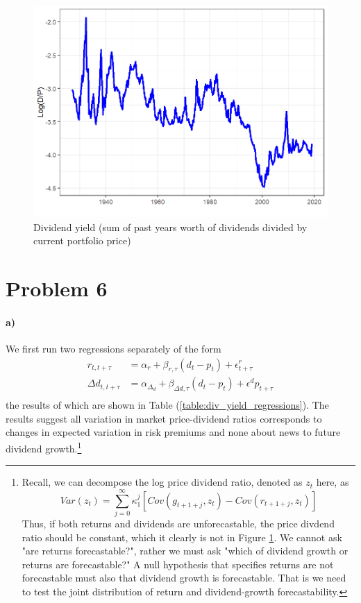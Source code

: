 \documentclass[11pt,letter]{article}
\begin{document}
\begin{figure}
	\centering
	\includegraphics[scale = 0.5]{log_dividend_yield.png}
	\caption{Dividend yield (sum of past years worth of dividends divided by current portfolio price)}
	\label{fig:div_yield}
\end{figure}
\section{Problem 6}
\paragraph{a)} 
We first run two regressions separately of the form
\begin{equation*}
	\begin{split}
	r_{t, t+\tau} & = \alpha_r + \beta_{r, \tau}(d_t - p_t) + \epsilon^r_{t+\tau}\\
	\Delta d_{t, t+\tau} & = \alpha_{\Delta_d}+\beta_{\Delta d, \tau}(d_t - p_t)+ \epsilon^dp_{t+\tau}\\
	\end{split}
\end{equation*}
the results of which are shown in Table (\ref{table:div_yield_regressions}). The results suggest all variation in market price-dividend ratios corresponds to changes in expected variation in risk premiums and none about news to future dividend growth.\footnote{ Recall, we can decompose the log price dividend ratio, denoted as $z_t$ here, as
\begin{equation*}
	Var(z_t) = \sum_{j=0}^{\infty}\kappa^j_1\left[Cov(g_{t+1+j}, z_t)- Cov(r_{t+1+j}, z_t)\right]
\end{equation*}
Thus, if both returns and dividends are unforecastable, the price divdend ratio should be constant, which it clearly is not in Figure \ref{fig:div_yield}. We cannot ask "are returns forecastable?", rather we must ask "which of dividend growth or returns are forecastable?" A null hypothesis that specifies returns are not forecastable must also that dividend growth is forecastable. That is we need to test the joint distribution of return and dividend-growth forecastability. }
\end{document}
